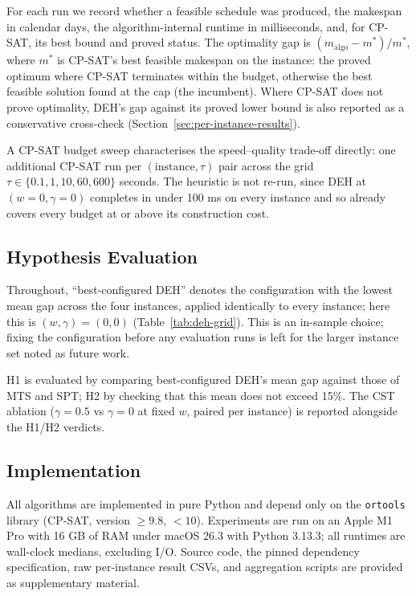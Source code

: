 \documentclass[conference]{IEEEtran}
\begin{document}
For each run we record whether a feasible schedule was produced, the
makespan in calendar days, the algorithm-internal runtime in
milliseconds, and, for CP-SAT, its best bound and proved status. The
optimality gap is $(m_{\text{algo}} - m^{*}) / m^{*}$, where $m^{*}$ is
CP-SAT's best feasible makespan on the instance: the proved optimum
where CP-SAT terminates within the budget, otherwise the best
feasible solution found at the cap (the incumbent). Where CP-SAT does not prove optimality, DEH's gap
against its proved lower bound is also reported as a conservative
cross-check (Section~\ref{sec:per-instance-results}).

A CP-SAT budget sweep characterises the speed--quality trade-off
directly: one additional CP-SAT run per $(\text{instance}, \tau)$ pair
across the grid $\tau \in \{0.1, 1, 10, 60, 600\}$ seconds. The
heuristic is not re-run, since DEH at $(w=0, \gamma=0)$ completes in
under 100 ms on every instance and so already covers every budget at
or above its construction cost.

\subsection{Hypothesis Evaluation}

Throughout, ``best-configured DEH'' denotes the configuration with
the lowest mean gap across the four instances, applied identically to
every instance; here this is $(w, \gamma) = (0, 0)$
(Table~\ref{tab:deh-grid}). This is an in-sample choice; fixing the configuration before any evaluation runs
is left for the larger instance set noted as future work.

H1 is evaluated by comparing best-configured DEH's mean gap against
those of MTS and SPT; H2 by checking that this mean does not exceed
15\%. The CST ablation ($\gamma = 0.5$ vs $\gamma = 0$ at fixed $w$,
paired per instance) is reported alongside the H1/H2 verdicts.

\subsection{Implementation}

All algorithms are implemented in pure Python and depend only on the
\texttt{ortools} library (CP-SAT, version $\geq 9.8$, $<10$).
Experiments are run on an Apple M1 Pro with 16 GB of RAM under macOS
26.3 with Python 3.13.3; all runtimes are wall-clock medians,
excluding I/O. Source code, the pinned dependency specification, raw
per-instance result CSVs, and aggregation scripts are provided as
supplementary material.
\end{document}
